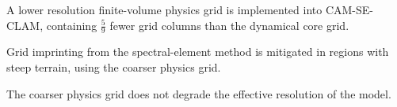 \documentclass[draft,linenumbers]{agujournal}
\begin{document}





\begin{keypoints}
\item A lower resolution finite-volume physics grid is implemented into CAM-SE-CLAM, containing $\frac{5}{9}$ fewer grid columns than the dynamical core grid.
\item Grid imprinting from the spectral-element method is mitigated in regions with steep terrain, using the coarser physics grid.
\item The coarser physics grid does not degrade the effective resolution of the model.
\end{keypoints}

%
%

\end{document}
